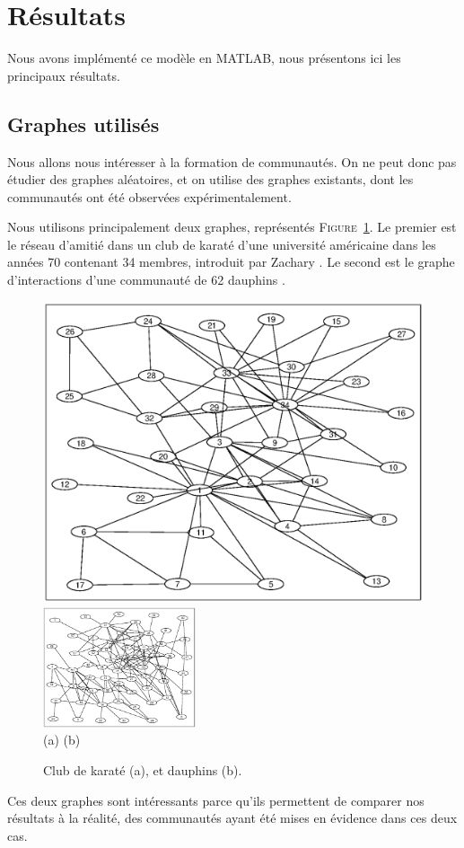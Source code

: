 \documentclass[12pt]{article}
\def\fig#1{\textsc{Figure}~\ref{#1}}
\begin{document}
\section{Résultats}
Nous avons implémenté ce modèle en \textsc{MATLAB}, nous présentons ici
les principaux résultats.


\subsection{Graphes utilisés}
Nous allons nous intéresser à la formation de communautés. On ne peut
donc pas étudier des graphes aléatoires, et on utilise des graphes
existants, dont les communautés ont été observées expérimentalement.

Nous utilisons principalement deux graphes, représentés
\fig{exemples_graphes}. Le premier est le réseau d'amitié dans un club
de karaté d'une université américaine dans les années 70 contenant 34
membres, introduit par Zachary \cite{zachary}. Le second est le graphe
d'interactions d'une communauté de 62 dauphins \cite{dolphins}.

\begin{figure}[htb]
	\begin{center}
		\includegraphics[width=.4 \textwidth]{zachary}
		\includegraphics[width=0.4\textwidth]{dolphins}\\
		\hfill (a) \hfill (b) \hfill~\\
	\end{center}
	\caption{Club de karaté (a), et dauphins (b).}
	\label{exemples_graphes}
\end{figure}

Ces deux graphes sont intéressants parce qu'ils permettent de comparer
nos résultats à la réalité, des communautés ayant été mises en
évidence dans ces deux cas.
\end{document}
